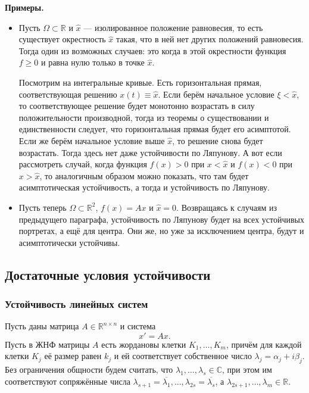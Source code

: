 \textbf{Примеры.} 
\begin{itemize}
    \item Пусть $\Omega \subset \mathbb R$ и $\widehat{x}$ --- изолированное положение равновесия, то есть существует окрестность $\widehat{x}$ такая, что в ней нет других положений равновесия.
        Тогда один из возможных случаев: это когда в этой окрестности функция $f \geq 0$ и равна нулю только в точке $\widehat{x}$.
        
        Посмотрим на интегральные кривые. Есть горизонтальная прямая, соответствующая решению
        $x(t) \equiv \widehat{x}$. Если берём начальное условие $\xi < \widehat{x}$, то соответствующее решение будет монотонно возрастать в силу положительности производной, тогда из теоремы о существовании и единственности следует, что горизонтальная прямая будет его асимптотой. Если же берём начальное условие выше $\widehat{x}$, то решение снова будет возрастать. Тогда здесь нет даже устойчивости по Ляпунову.
        А вот если рассмотреть случай, когда функция $f(x) > 0$ при $x < \widehat{x}$ и $f(x) < 0$ при $x > \widehat{x}$, то аналогичным образом можно показать, что там будет асимптотическая устойчивость, а тогда и устойчивость по Ляпунову.
    \item Пусть теперь $\Omega \subset \mathbb{R}^2$, $f(x) = Ax$ и $\widehat{x} = 0$. Возвращаясь к случаям из предыдущего параграфа, устойчивость по Ляпунову будет на всех устойчивых портретах, а ещё для центра. Они же, но уже за исключением центра, будут и асимптотически устойчивы.
    
\end{itemize}
\subsection{Достаточные условия устойчивости}
\subsubsection{Устойчивость линейных систем}
Пусть даны матрица $A \in \mathbb R^{n \times n}$ и система
\begin{equation}
    x' = Ax.
\end{equation}
Пусть в ЖНФ матрицы $A$ есть жордановы клетки $K_1, \dots, K_m$, причём для каждой клетки $K_j$ её размер равен $k_j$ и ей соответствует собственное число $\lambda_j = \alpha_j + i\beta_j$. Без ограничения общности будем считать, что $\lambda_1, \dots, \lambda_s \in \mathbb C$, при этом им соответствуют сопряжённые числа $\lambda_{s+1} = \overline{\lambda_1}, \dots, \lambda_{2s} = \overline{\lambda_s}$, а $\lambda_{2s+1}, \dots, \lambda_m \in \mathbb R$.

